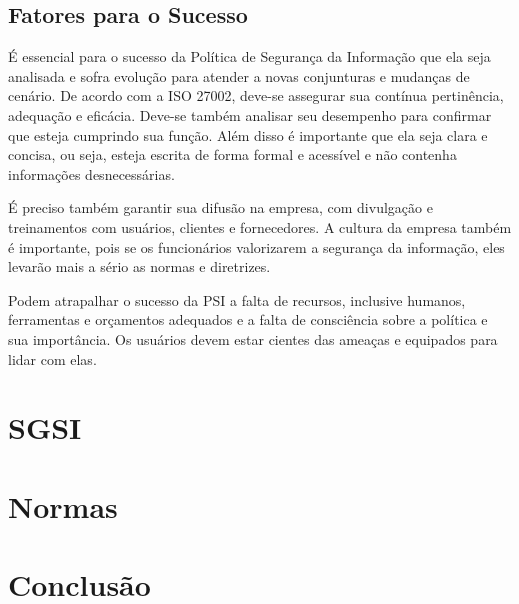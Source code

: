 \documentclass[12pt]{article}
\begin{document}
\subsection{Fatores para o Sucesso}
É essencial para o sucesso da Política de Segurança da Informação que
ela seja analisada e sofra evolução para atender a novas conjunturas e mudanças de cenário.
De acordo com a ISO 27002, deve-se assegurar sua contínua pertinência, adequação e eficácia.
Deve-se também analisar seu desempenho para confirmar que esteja cumprindo sua função. Além disso é importante que
ela seja clara e concisa, ou seja, esteja escrita de forma formal e acessível e não contenha informações desnecessárias.

É preciso também garantir sua difusão na empresa, com divulgação e treinamentos com usuários, clientes e fornecedores.
A cultura da empresa também é importante, pois se os funcionários valorizarem a segurança da informação,
eles levarão mais a sério as normas e diretrizes.

Podem atrapalhar o sucesso da PSI a falta de recursos, inclusive humanos, 
ferramentas e orçamentos adequados e a falta de consciência sobre a política e sua importância.
Os usuários devem estar cientes das ameaças e equipados para lidar com elas.

\section{SGSI}


\section{Normas}

\section{Conclusão}


\newpage



\end{document}
